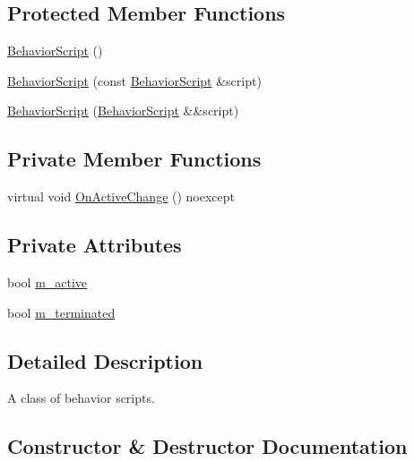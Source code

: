 \subsection*{Protected Member Functions}
\begin{DoxyCompactItemize}
\item 
\hyperlink{classmage_1_1_behavior_script_ad064a6bbe2ba5f7622d1d20eeec958bf}{Behavior\+Script} ()
\item 
\hyperlink{classmage_1_1_behavior_script_ab95b988867dfb8592ab7678bff608116}{Behavior\+Script} (const \hyperlink{classmage_1_1_behavior_script}{Behavior\+Script} \&script)
\item 
\hyperlink{classmage_1_1_behavior_script_aa8f509053f6bb9dbfd3baa75bdd8b91e}{Behavior\+Script} (\hyperlink{classmage_1_1_behavior_script}{Behavior\+Script} \&\&script)
\end{DoxyCompactItemize}
\subsection*{Private Member Functions}
\begin{DoxyCompactItemize}
\item 
virtual void \hyperlink{classmage_1_1_behavior_script_a17703fd980599ccf7265b5ffc6148fe8}{On\+Active\+Change} () noexcept
\end{DoxyCompactItemize}
\subsection*{Private Attributes}
\begin{DoxyCompactItemize}
\item 
bool \hyperlink{classmage_1_1_behavior_script_a18f81792aed31a2d61a8a75784e2ceef}{m\+\_\+active}
\item 
bool \hyperlink{classmage_1_1_behavior_script_abc4a0e6728787347012404a597ab8e07}{m\+\_\+terminated}
\end{DoxyCompactItemize}


\subsection{Detailed Description}
A class of behavior scripts. 

\subsection{Constructor \& Destructor Documentation}
\hypertarget{classmage_1_1_behavior_script_a61e4825ba0fc7746d49faa44ed7bc481}{}\label{classmage_1_1_behavior_script_a61e4825ba0fc7746d49faa44ed7bc481} 
